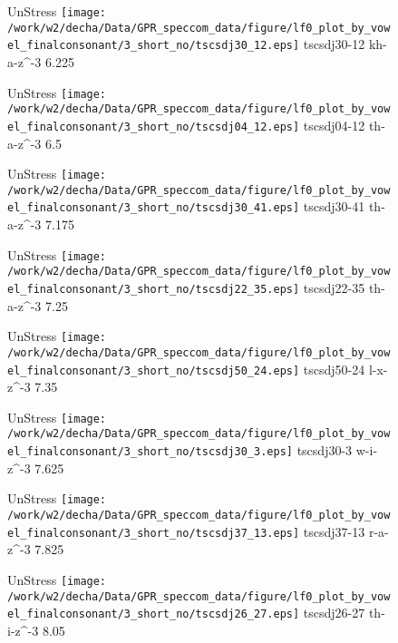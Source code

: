 \documentclass{article}
\begin{document}
\begin{figure}[t]
\begin{minipage}[b]{.24\textwidth}
UnStress
\centering
\texttt{[image: /work/w2/decha/Data/GPR\_speccom\_data/figure/lf0\_plot\_by\_vowel\_finalconsonant/3\_short\_no/tscsdj30\_12.eps]}
tscsdj30-12 kh-a-z\textasciicircum-3 6.225
\end{minipage}
\begin{minipage}[b]{.24\textwidth}
UnStress
\centering
\texttt{[image: /work/w2/decha/Data/GPR\_speccom\_data/figure/lf0\_plot\_by\_vowel\_finalconsonant/3\_short\_no/tscsdj04\_12.eps]}
tscsdj04-12 th-a-z\textasciicircum-3 6.5
\end{minipage}
\begin{minipage}[b]{.24\textwidth}
UnStress
\centering
\texttt{[image: /work/w2/decha/Data/GPR\_speccom\_data/figure/lf0\_plot\_by\_vowel\_finalconsonant/3\_short\_no/tscsdj30\_41.eps]}
tscsdj30-41 th-a-z\textasciicircum-3 7.175
\end{minipage}
\begin{minipage}[b]{.24\textwidth}
UnStress
\centering
\texttt{[image: /work/w2/decha/Data/GPR\_speccom\_data/figure/lf0\_plot\_by\_vowel\_finalconsonant/3\_short\_no/tscsdj22\_35.eps]}
tscsdj22-35 th-a-z\textasciicircum-3 7.25
\end{minipage}
\end{figure}

\begin{figure}[t]
\begin{minipage}[b]{.24\textwidth}
UnStress
\centering
\texttt{[image: /work/w2/decha/Data/GPR\_speccom\_data/figure/lf0\_plot\_by\_vowel\_finalconsonant/3\_short\_no/tscsdj50\_24.eps]}
tscsdj50-24 l-x-z\textasciicircum-3 7.35
\end{minipage}
\begin{minipage}[b]{.24\textwidth}
UnStress
\centering
\texttt{[image: /work/w2/decha/Data/GPR\_speccom\_data/figure/lf0\_plot\_by\_vowel\_finalconsonant/3\_short\_no/tscsdj30\_3.eps]}
tscsdj30-3 w-i-z\textasciicircum-3 7.625
\end{minipage}
\begin{minipage}[b]{.24\textwidth}
UnStress
\centering
\texttt{[image: /work/w2/decha/Data/GPR\_speccom\_data/figure/lf0\_plot\_by\_vowel\_finalconsonant/3\_short\_no/tscsdj37\_13.eps]}
tscsdj37-13 r-a-z\textasciicircum-3 7.825
\end{minipage}
\begin{minipage}[b]{.24\textwidth}
UnStress
\centering
\texttt{[image: /work/w2/decha/Data/GPR\_speccom\_data/figure/lf0\_plot\_by\_vowel\_finalconsonant/3\_short\_no/tscsdj26\_27.eps]}
tscsdj26-27 th-i-z\textasciicircum-3 8.05
\end{minipage}
\end{figure}
\end{document}
